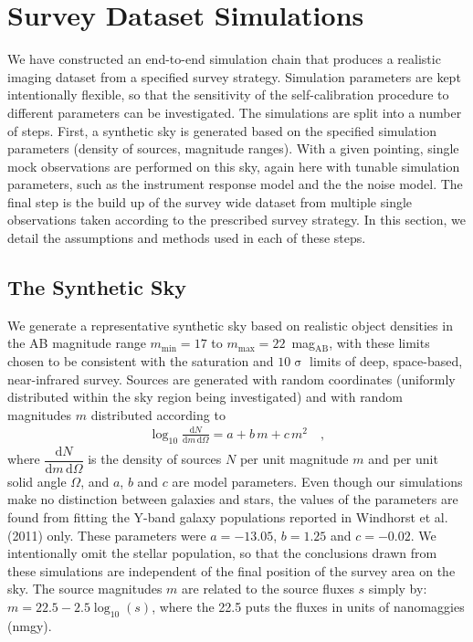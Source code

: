 \documentclass[manuscript]{aastex}
\newcommand{\dd}{\text{d}}
\begin{document}
\section{Survey Dataset Simulations}
\label{sec:survey}
We have constructed an end-to-end simulation chain that produces a realistic imaging dataset from a specified survey strategy. Simulation parameters are kept intentionally flexible, so that the sensitivity of the self-calibration procedure to different parameters can be investigated. The simulations are split into a number of steps. First, a synthetic sky is generated based on the specified simulation parameters (density of sources, magnitude ranges). With a given pointing, single mock observations are performed on this sky, again here with tunable simulation parameters, such as the instrument response model and the the noise model. The final step is the build up of the survey wide dataset from multiple single observations taken according to the prescribed survey strategy. In this section, we detail the assumptions and methods used in each of these steps. 

\subsection{The Synthetic Sky}
We generate a representative synthetic sky based on realistic object densities in the AB magnitude range $m_\text{min} = 17$ to $m_\text{max} = 22$~mag$_\text{AB}$, with these limits chosen to be consistent with the saturation and $10\upsigma{}$ limits of deep, space-based, near-infrared survey. Sources are generated with random coordinates (uniformly distributed within the sky region being investigated) and with random magnitudes $m$ distributed according to
\begin{eqnarray}
\log_{10} \frac{\dd N}{\dd m \, \dd \Omega} = a + b\,m + c\,m^2 \label{eqn:power_law} \quad , 
\end{eqnarray}
where $\dfrac{\dd N}{\dd m \, \dd  \Omega}$  is the density of sources $N$ per unit magnitude $m$ and per unit solid angle $\Omega$, and $a$, $b$ and $c$ are model parameters. Even though our simulations make no distinction between galaxies and stars, the values of the parameters are found from fitting the Y-band galaxy populations reported in Windhorst et al. (2011) \cite{source_densities} only. These parameters were $a = -13.05$, $b = 1.25$ and $c = -0.02$. We intentionally omit the stellar population, so that the conclusions drawn from these simulations are independent of the final position of the survey area on the sky. The source magnitudes $m$ are related to the source fluxes $s$ simply by: $m = 22.5 - 2.5\log_{10}(s)$, where the 22.5 puts the fluxes in units of nanomaggies (nmgy).
\end{document}
